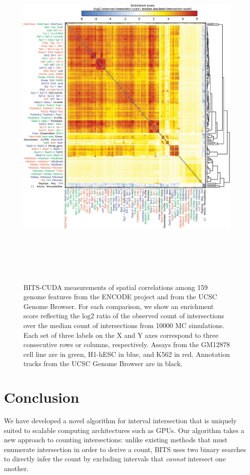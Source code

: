 \documentclass{bioinfo}
\begin{document}
\begin{figure}[btp]
        \includegraphics[width=7in,height=7in]{heatmap_matrix_nolabels_10000iterations.eps}
        \caption[]{BITS-CUDA measurements of spatial correlations
among 159 genome features from the ENCODE project and from the UCSC
Genome Browser. For each comparison, we show an enrichment score
reflecting the log2 ratio of the observed count of intersections over
the median count of intersections from 10000 MC simulations. Each set of three
labels on the X and Y axes correspond to three consecutive rows or columns,
respectively. Assays from the GM12878 cell line are in green, H1-hESC in blue,
and K562 in red.  Annotation tracks from the UCSC Genome Browser are in black.}
\end{figure}




\section{Conclusion}
We have developed a novel algorithm for interval intersection that
is uniquely suited to scalable computing architectures such as GPUs.
Our algorithm takes a new approach to counting intersections: 
unlike existing methods that must enumerate intersection in order to 
derive a count, BITS uses two binary searches to directly infer the 
count by excluding intervals that \emph{cannot} intersect one another. 
\end{document}
